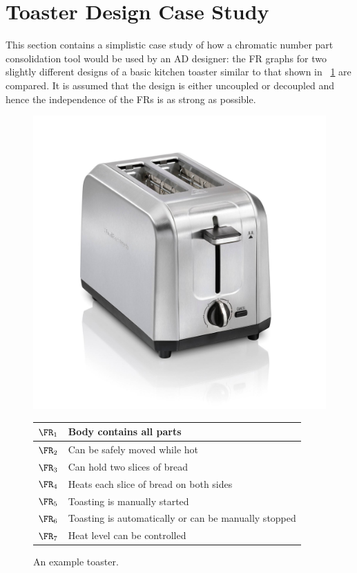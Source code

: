 \section{Toaster Design Case Study}

This section contains a simplistic case study of how a chromatic number part consolidation tool would be used by an
AD designer: the FR graphs for two slightly different designs of a basic kitchen toaster similar to that shown in
\figurename~\ref{fig:toaster} are compared.  It is assumed that the design is either uncoupled or decoupled and
hence the independence of the FRs is as strong as possible.

\begin{figure}[H]
  \centering
  \includegraphics[scale=0.155]{toaster}

  \begin{tabular}{|c|l|}
    \hline
    \(\FR_1\) & Body contains all parts \\
    \hline
    \(\FR_2\) & Can be safely moved while hot \\
    \hline
    \(\FR_3\) & Can hold two slices of bread \\
    \hline
    \(\FR_4\) & Heats each slice of bread on both sides \\
    \hline
    \(\FR_5\) & Toasting is manually started \\
    \hline
    \(\FR_6\) & Toasting is automatically or can be manually stopped \\
    \hline
    \(\FR_7\) & Heat level can be controlled \\
    \hline
  \end{tabular}
  \caption{An example toaster.}
  \label{fig:toaster}
\end{figure}

